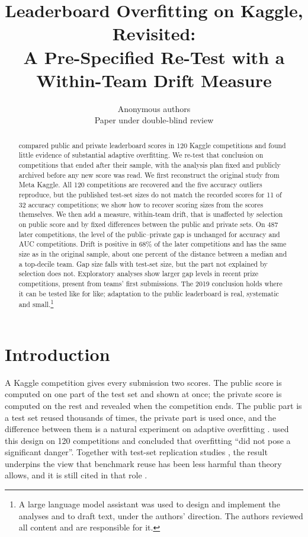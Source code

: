 \documentclass[10pt]{article}
\title{Leaderboard Overfitting on Kaggle, Revisited:\\ A Pre-Specified Re-Test with a Within-Team Drift Measure}
\author{\name Anonymous authors \\ \addr Paper under double-blind review}
\begin{document}
\maketitle

\begin{abstract}
\citet{roelofs2019meta} compared public and private leaderboard scores in 120 Kaggle competitions and found little evidence of substantial adaptive overfitting. We re-test that conclusion on competitions that ended after their sample, with the analysis plan fixed and publicly archived before any new score was read. We first reconstruct the original study from Meta Kaggle. All 120 competitions are recovered and the five accuracy outliers reproduce, but the published test-set sizes do not match the recorded scores for 11 of 32 accuracy competitions; we show how to recover scoring sizes from the scores themselves. We then add a measure, within-team drift, that is unaffected by selection on public score and by fixed differences between the public and private sets. On 487 later competitions, the level of the public--private gap is unchanged for accuracy and AUC competitions. Drift is positive in 68\% of the later competitions and has the same size as in the original sample, about one percent of the distance between a median and a top-decile team. Gap size falls with test-set size, but the part not explained by selection does not. Exploratory analyses show larger gap levels in recent prize competitions, present from teams' first submissions. The 2019 conclusion holds where it can be tested like for like; adaptation to the public leaderboard is real, systematic and small.\footnote{A large language model assistant was used to design and implement the analyses and to draft text, under the authors' direction. The authors reviewed all content and are responsible for it.}
\end{abstract}

\section{Introduction}

A Kaggle competition gives every submission two scores. The public score is computed on one part of the test set and shown at once; the private score is computed on the rest and revealed when the competition ends. The public part is a test set reused thousands of times, the private part is used once, and the difference between them is a natural experiment on adaptive overfitting \citep{dwork2015reusable,blum2015ladder}. \citet{roelofs2019meta} used this design on 120 competitions and concluded that overfitting ``did not pose a significant danger''. Together with test-set replication studies \citep{recht2019imagenet,yadav2019cold}, the result underpins the view that benchmark reuse has been less harmful than theory allows, and it is still cited in that role \citep{sculley2025position}.
\end{document}
